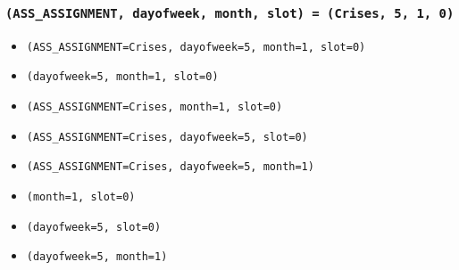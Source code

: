 \documentclass{beamer}
\begin{document}
\begin{frame}[fragile]\frametitle{\texttt{(ASS\_ASSIGNMENT, dayofweek, month, slot) 
= (Crises, 5, 1, 0)}}
\begin{itemize}[<+->]
\item
\begin{verbatim}
(ASS_ASSIGNMENT=Crises, dayofweek=5, month=1, slot=0)
\end{verbatim}
\item
\begin{verbatim}
(dayofweek=5, month=1, slot=0)
\end{verbatim}
\item
\begin{verbatim}
(ASS_ASSIGNMENT=Crises, month=1, slot=0)
\end{verbatim}
\item
\begin{verbatim}
(ASS_ASSIGNMENT=Crises, dayofweek=5, slot=0)
\end{verbatim}
\item
\begin{verbatim}
(ASS_ASSIGNMENT=Crises, dayofweek=5, month=1)
\end{verbatim}
\item
\begin{verbatim}
(month=1, slot=0)
\end{verbatim}
\item
\begin{verbatim}
(dayofweek=5, slot=0)
\end{verbatim}
\item
\begin{verbatim}
(dayofweek=5, month=1)
\end{verbatim}
\end{itemize}
\end{frame}
\end{document}
